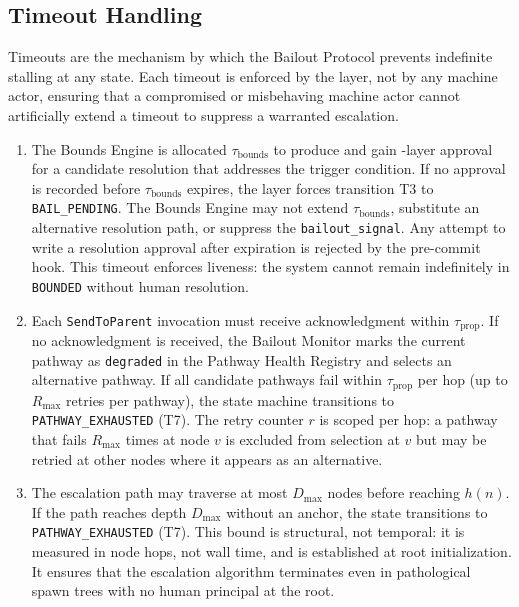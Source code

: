 \subsection{Timeout Handling}
\label{sec:bp-timeouts}

Timeouts are the mechanism by which the Bailout Protocol prevents indefinite stalling at any state. Each timeout is enforced by the \fact{} layer, not by any machine actor, ensuring that a compromised or misbehaving machine actor cannot artificially extend a timeout to suppress a warranted escalation.

\begin{enumerate}\itemsep=0pt
\item[$\textbf{\tau_{\text{bounds}} ---\ \texttt{BOUNDED} state timeout.}$] The Bounds Engine is allocated $\tau_{\text{bounds}}$ to produce and gain \fact{}-layer approval for a candidate resolution that addresses the trigger condition. If no approval is recorded before $\tau_{\text{bounds}}$ expires, the \fact{} layer forces transition T3 to \texttt{BAIL\_PENDING}. The Bounds Engine may not extend $\tau_{\text{bounds}}$, substitute an alternative resolution path, or suppress the \texttt{bailout\_signal}. Any attempt to write a resolution approval after expiration is rejected by the pre-commit hook. This timeout enforces liveness: the system cannot remain indefinitely in \texttt{BOUNDED} without human resolution.

\item[$\textbf{\tau_{\text{prop}} ---\ Propagation timeout.}$] Each \texttt{SendToParent} invocation must receive acknowledgment within $\tau_{\text{prop}}$. If no acknowledgment is received, the Bailout Monitor marks the current pathway as \texttt{degraded} in the Pathway Health Registry and selects an alternative pathway. If all candidate pathways fail within $\tau_{\text{prop}}$ per hop (up to $R_{\max}$ retries per pathway), the state machine transitions to \texttt{PATHWAY\_EXHAUSTED} (T7). The retry counter $r$ is scoped per hop: a pathway that fails $R_{\max}$ times at node $v$ is excluded from selection at $v$ but may be retried at other nodes where it appears as an alternative.

\item[$\textbf{\tau_{\text{cap}} ---\ Cascade depth limit.}$] The escalation path may traverse at most $D_{\max}$ nodes before reaching $h(n)$. If the path reaches depth $D_{\max}$ without an anchor, the state transitions to \texttt{PATHWAY\_EXHAUSTED} (T7). This bound is structural, not temporal: it is measured in node hops, not wall time, and is established at root initialization. It ensures that the escalation algorithm terminates even in pathological spawn trees with no human principal at the root.


\end{enumerate}
